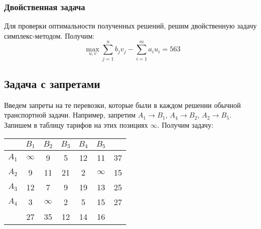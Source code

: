 \subsubsection{Двойственная задача}
Для проверки оптимальности полученных решений, решим двойственную задачу симплекс-методом. Получим:
\begin{equation*}
\max_{u,v} \sum_{j=1}^n b_j v_j - \sum_{i=1}^m a_i u_i = 563 
\end{equation*}

\subsection{Задача с запретами}
Введем запреты на те перевозки, которые были в каждом решении обычной транспортной задачи. Например, запретим $A_1 \rightarrow B_1$, $A_4 \rightarrow B_2$, $A_2 \rightarrow B_5$. Запишем в таблицу тарифов на этих позициях $\infty$. Получим задачу:
\begin{table}[!ht]
	\centering
		\begin{tabular} {|c|c|c|c|c|c|c|}
			\hline
			 & $B_1$ & $B_2$ & $B_3$ & $B_4$ & $B_5$ & \\ \hline
			$A_1$ & $\infty$ & 9 & 5 & 12 & 11 & 37 \\ \hline
			$A_2$ & 9 & 11 & 21 & 2 & $\infty$ & 15 \\ \hline
			$A_3$ & 12 & 7 & 9 & 19 & 13 & 25 \\ \hline
			$A_4$ & 3 & $\infty$ & 2 & 5 & 15 & 27 \\ \hline
			 & 27 & 35 & 12 & 14 & 16 & \\ \hline
		\end{tabular}
\end{table}

